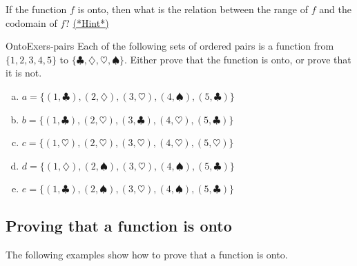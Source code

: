 \begin{exercise}{45}
If the function $f$ is onto, then what is the relation between the range of $f$ and the codomain of $f$?
\hyperref[sec:functions:hints]{(*Hint*)}
\end{exercise}


\begin{exercise}{OntoExers-pairs}
Each of the following sets of ordered pairs is a function from $\{1,2,3,4,5\}$ to $\{\clubsuit,\diamondsuit,\heartsuit,\spadesuit\}$. Either prove that the function is onto, or prove that it is not.
\begin{enumerate}[(a)]
\item \label{OntoExers-pairs-a}
$a = \{ (1,\clubsuit), (2,\diamondsuit), (3,\heartsuit), (4,\spadesuit), (5,\clubsuit) \}$
\item \label{OntoExers-pairs-b}
$b = \{ (1,\clubsuit), (2,\heartsuit), (3,\clubsuit), (4,\heartsuit), (5,\clubsuit) \}$
\item \label{OntoExers-pairs-c}
$c = \{ (1,\heartsuit), (2,\heartsuit), (3, \heartsuit), (4,\heartsuit), (5, \heartsuit) \}$
\item \label{OntoExers-pairs-d}
$d = \{ (1,\diamondsuit), (2,\spadesuit), (3, \heartsuit), (4,\spadesuit), (5, \clubsuit) \}$
\item \label{OntoExers-pairs-e}
$e = \{ (1,\clubsuit), (2,\spadesuit), (3, \heartsuit), (4,\spadesuit), (5, \clubsuit) \}$
\end{enumerate}
\end{exercise}



\subsection{Proving that a function is onto}

The following examples show how to prove that a function is onto.

